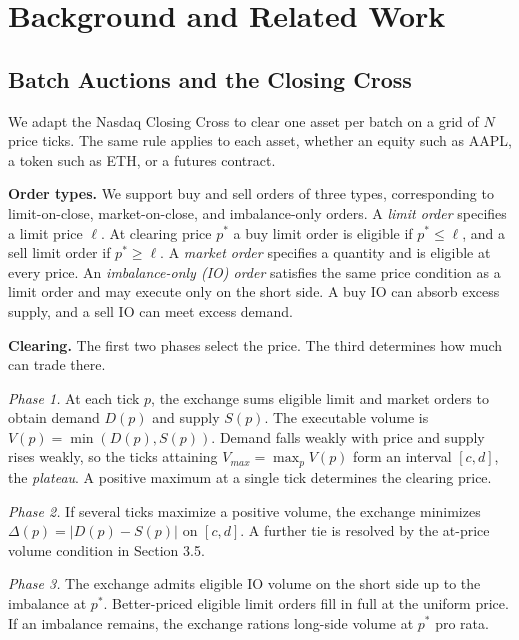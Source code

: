 
\section{Background and Related Work}

\subsection{Batch Auctions and the Closing Cross}

We adapt the Nasdaq Closing Cross \cite{nasdaq4754} to clear one asset per batch on a grid of \(N\) price ticks. The same rule applies to each asset, whether an equity such as AAPL, a token such as ETH, or a futures contract.

\textbf{Order types.} We support buy and sell orders of three types, corresponding to limit-on-close, market-on-close, and imbalance-only orders. A \emph{limit order} specifies a limit price \(\ell\). At clearing price \(p^*\) a buy limit order is eligible if \(p^* \le \ell\), and a sell limit order if \(p^* \ge \ell\). A \emph{market order} specifies a quantity and is eligible at every price. An \emph{imbalance-only (IO) order} satisfies the same price condition as a limit order and may execute only on the short side. A buy IO can absorb excess supply, and a sell IO can meet excess demand.

\textbf{Clearing.} The first two phases select the price. The third determines how much can trade there.

\emph{Phase 1.} At each tick \(p\), the exchange sums eligible limit and market orders to obtain demand \(D(p)\) and supply \(S(p)\). The executable volume is \(V(p)=\min(D(p),S(p))\). Demand falls weakly with price and supply rises weakly, so the ticks attaining \(V_{max}=\max_p V(p)\) form an interval \([c,d]\), the \emph{plateau}. A positive maximum at a single tick determines the clearing price.

\emph{Phase 2.} If several ticks maximize a positive volume, the exchange minimizes \(\Delta(p)=|D(p)-S(p)|\) on \([c,d]\). A further tie is resolved by the at-price volume condition in Section 3.5.

\emph{Phase 3.} The exchange admits eligible IO volume on the short side up to the imbalance at \(p^*\). Better-priced eligible limit orders fill in full at the uniform price. If an imbalance remains, the exchange rations long-side volume at \(p^*\) pro rata.

